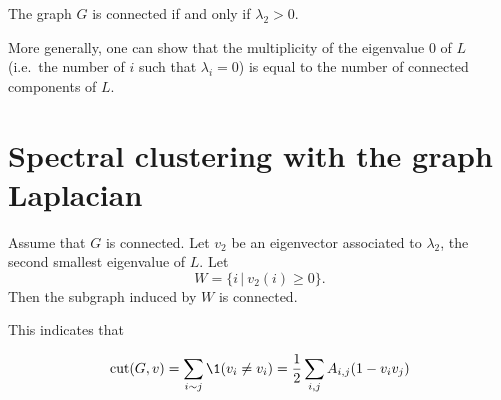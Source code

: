 \documentclass[11pt,nocut]{article}
\begin{document}
\begin{proposition}
	The graph $G$ is connected if and only if $\lambda_2 > 0$.
\end{proposition}
More generally, one can show that the multiplicity of the eigenvalue $0$ of $L$ (i.e.\ the number of $i$ such that $\lambda_i = 0$) is equal to the number of connected components of $L$.

\section{Spectral clustering with the graph Laplacian}

\begin{proposition}
	Assume that $G$ is connected. Let $v_2$ be an eigenvector associated to $\lambda_2$, the second smallest eigenvalue of $L$. Let
	$$
	W = \{ i \, | \ v_2(i) \geq 0 \}.
	$$
	Then the subgraph induced by $W$ is connected.
\end{proposition}

This indicates that 

$$
{\rm cut}(G,v) = \sum_{i \sim j} \1(v_i \neq v_i) = \frac{1}{2} \sum_{i,j} A_{i,j} (1 - v_i v_j)
$$
\vspace{1cm}
\centerline{}

%
%
\end{document}
